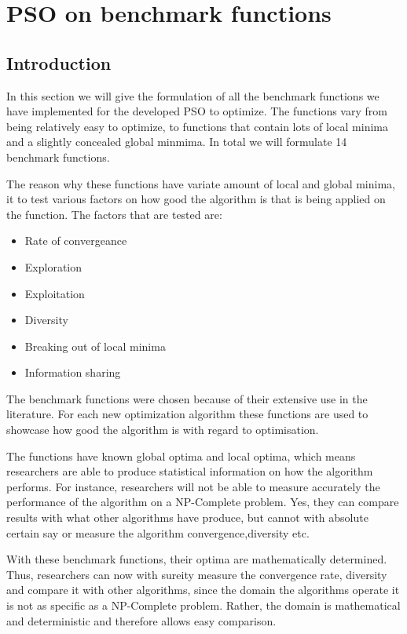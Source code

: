 \chapter{PSO on benchmark functions}
\section{Introduction}
In this section we will give the formulation of all the benchmark functions we have implemented for the developed PSO to optimize. The functions vary from being relatively easy to optimize, to functions that contain lots of local minima and a slightly concealed global minmima. In total we will formulate 14 benchmark functions.

The reason why these functions have variate amount of local and global minima, it to test various factors on how good the algorithm is that is being applied on the function. The factors that are tested are:
\begin{itemize}
\item Rate of convergeance
\item Exploration
\item Exploitation
\item Diversity
\item Breaking out of local minima
\item Information sharing
\end{itemize}

The benchmark functions were chosen because of their extensive use in the literature. For each new optimization algorithm these functions are used to showcase how good the algorithm is with regard to optimisation.

The functions have known global optima and local optima, which means researchers are able to produce statistical information on how the algorithm performs. For instance, researchers will not be able to measure accurately the performance of the algorithm on a NP-Complete problem. Yes, they can compare results with what other algorithms have produce, but cannot with absolute certain say or measure the algorithm convergence,diversity etc. 

With these benchmark functions, their optima are mathematically determined. Thus, researchers can now with sureity measure the convergence rate, diversity and compare it with other algorithms, since the domain the algorithms operate it is not as specific as a NP-Complete problem. Rather, the domain is mathematical and deterministic and therefore allows easy comparison.

